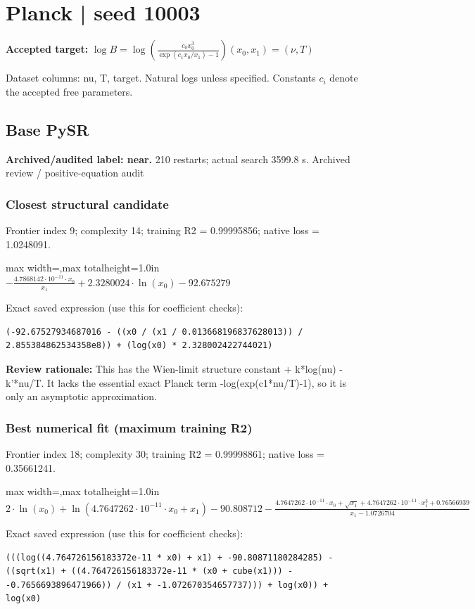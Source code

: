 \documentclass[10pt,letterpaper,landscape]{article}
\begin{document}
\section*{Planck | seed 10003}
\textbf{Accepted target:} $\displaystyle \log B=\log\!\left(\frac{c_0 x_0^3}{\exp(c_1x_0/x_1)-1}\right)$\hfill $(x_0,x_1)=(\nu,T)$\par
{\small Dataset columns: nu, T, target. Natural logs unless specified. Constants $c_i$ denote the accepted free parameters.}\par\medskip
\begin{minipage}[t]{0.485\textwidth}
\subsection*{Base PySR}
\textbf{Archived/audited label: near.} 210 restarts; actual search 3599.8 s.
{\small Archived review / positive-equation audit}
\subsubsection*{Closest structural candidate}
Frontier index 9; complexity 14; training R2 = 0.99995856; native loss = 1.0248091.
\begin{center}\begin{adjustbox}{max width=\linewidth,max totalheight=1.0in}$\displaystyle - \frac{4.7868142 \cdot 10^{-11} \cdot x_{0}}{x_{1}} + 2.3280024 \cdot \ln{\left(x_{0} \right)} - 92.675279$\end{adjustbox}\end{center}
{\scriptsize Exact saved expression (use this for coefficient checks):}
\begin{lstlisting}
(-92.67527934687016 - ((x0 / (x1 / 0.013668196837628013)) / 2.855384862534358e8)) + (log(x0) * 2.328002422744021)
\end{lstlisting}
{\small\textbf{Review rationale:} This has the Wien-limit structure constant + k*log(nu) - k'*nu/T. It lacks the essential exact Planck term -log(exp(c1*nu/T)-1), so it is only an asymptotic approximation.}
\subsubsection*{Best numerical fit (maximum training R2)}
Frontier index 18; complexity 30; training R2 = 0.99998861; native loss = 0.35661241.
\begin{center}\begin{adjustbox}{max width=\linewidth,max totalheight=1.0in}$\displaystyle 2 \cdot \ln{\left(x_{0} \right)} + \ln{\left(4.7647262 \cdot 10^{-11} \cdot x_{0} + x_{1} \right)} - 90.808712 - \frac{4.7647262 \cdot 10^{-11} \cdot x_{0} + \sqrt{x_{1}} + 4.7647262 \cdot 10^{-11} \cdot x_{1}^{3} + 0.76566939}{x_{1} - 1.0726704}$\end{adjustbox}\end{center}
{\scriptsize Exact saved expression (use this for coefficient checks):}
\begin{lstlisting}
(((log((4.764726156183372e-11 * x0) + x1) + -90.80871180284285) - ((sqrt(x1) + ((4.764726156183372e-11 * (x0 + cube(x1))) - -0.7656693896471966)) / (x1 + -1.072670354657737))) + log(x0)) + log(x0)
\end{lstlisting}
\end{minipage}\hfill
\end{document}
